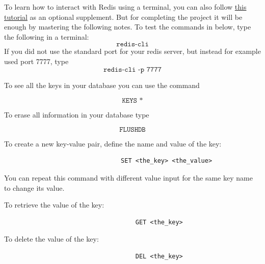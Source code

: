 \documentclass{article}
\begin{document}
To learn how to interact with Redis using a terminal, you can also follow {\color{blue}\href{https://auth0.com/blog/introduction-to-redis-install-cli-commands-and-data-types/}{this tutorial}} as an optional supplement. But for completing the project it will be enough by mastering the following notes. To test the commands in below, type the following in a terminal:
\begin{equation}
    \texttt{redis-cli}
\end{equation}
If you did not use the standard port for your redis server, but instead for example used port 7777, type
\begin{equation}
    \texttt{redis-cli -p 7777}
\end{equation}

\parbox[t]{14cm}{To see all the keys in your database you can use the command 
}
\begin{equation}
    \texttt{KEYS *}
\end{equation}
\parbox[t]{14cm}{To erase all information in your database type 
}
\begin{equation}
    \texttt{FLUSHDB}
\end{equation}

\parbox[t]{14cm}{To create a new key-value pair, define the name and value of the key:
}
                            \begin{verbatim}
                                SET <the_key> <the_value>
                            \end{verbatim}
 
\noindent You can repeat this command with different value input for the same key name to change its value.\\


\parbox[t]{14cm}{To retrieve the value of the key:
}
                                \begin{verbatim}
                                    GET <the_key> 
                                \end{verbatim}

\parbox[t]{14cm}{To delete the value of the key:
}
                                \begin{verbatim}
                                    DEL <the_key> 
                                \end{verbatim}
\end{document}
